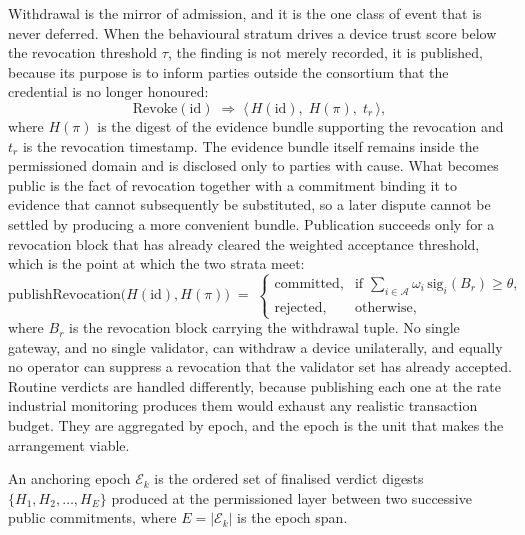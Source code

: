 Withdrawal is the mirror of admission, and it is the one class of event that is never deferred. When the behavioural stratum drives a device trust score below the revocation threshold $\tau$, the finding is not merely recorded, it is published, because its purpose is to inform parties outside the consortium that the credential is no longer honoured:
\begin{equation}
\label{eq:revoke}
\mathrm{Revoke}(\mathrm{id}) \;\Longrightarrow\; \big\langle \, H(\mathrm{id}), \; H(\pi), \; t_r \, \big\rangle ,
\end{equation}
where $H(\pi)$ is the digest of the evidence bundle supporting the revocation and $t_r$ is the revocation timestamp. The evidence bundle itself remains inside the permissioned domain and is disclosed only to parties with cause. What becomes public is the fact of revocation together with a commitment binding it to evidence that cannot subsequently be substituted, so a later dispute cannot be settled by producing a more convenient bundle. Publication succeeds only for a revocation block that has already cleared the weighted acceptance threshold, which is the point at which the two strata meet:
\begin{equation}
\label{eq:publish-revocation}
\mathrm{publishRevocation}\big(H(\mathrm{id}), H(\pi)\big) \;=\;
\begin{cases}
\text{committed}, & \text{if } \displaystyle\sum_{i \in \mathcal{A}} \omega_i \, \mathrm{sig}_i(B_r) \geq \theta, \\[6pt]
\text{rejected}, & \text{otherwise},
\end{cases}
\end{equation}
where $B_r$ is the revocation block carrying the withdrawal tuple. No single gateway, and no single validator, can withdraw a device unilaterally, and equally no operator can suppress a revocation that the validator set has already accepted.
Routine verdicts are handled differently, because publishing each one at the rate industrial monitoring produces them would exhaust any realistic transaction budget. They are aggregated by epoch, and the epoch is the unit that makes the arrangement viable.

\begin{definition}
\label{def:epoch}
An anchoring epoch $\mathcal{E}_k$ is the ordered set of finalised verdict digests $\{H_1, H_2, \ldots, H_E\}$ produced at the permissioned layer between two successive public commitments, where $E = |\mathcal{E}_k|$ is the epoch span.
\end{definition}

